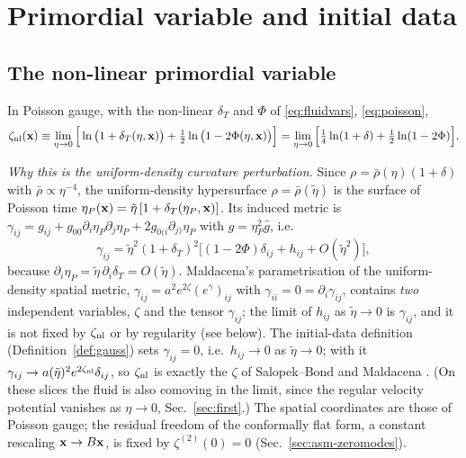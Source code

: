 \section{Primordial variable and initial data}
\label{sec:primordial}

\subsection{The non-linear primordial variable}
\label{sec:zeta_def}
\begin{definition}\label{def:zeta}
In Poisson gauge, with the non-linear $\delta_T$ and $\Phi$ of \eqref{eq:fluidvars}, \eqref{eq:poisson},
\begin{equation}
\zeta_{\rm nl}(\mathbf x)\equiv\lim_{\eta\to0}\Big[\ln\big(1+\delta_T(\eta,\mathbf x)\big)+\tfrac12\ln\big(1-2\Phi(\eta,\mathbf x)\big)\Big]
=\lim_{\eta\to0}\Big[\tfrac14\ln(1+\delta)+\tfrac12\ln(1-2\Phi)\Big].
\label{eq:zeta_nl}
\end{equation}
\end{definition}
\noindent\emph{Why this is the uniform-density curvature perturbation.}  Since $\rho=\bar\rho(\eta)(1+\delta)$
with $\bar\rho\propto\eta^{-4}$, the uniform-density hypersurface $\rho=\bar\rho(\tilde\eta)$ is the
surface of Poisson time $\eta_P(\mathbf x)=\tilde\eta\,[1+\delta_T(\eta_P,\mathbf x)]$.  Its induced metric is
$\gamma_{ij}=g_{ij}+g_{00}\partial_i\eta_P\partial_j\eta_P+2g_{0(i}\partial_{j)}\eta_P$ with $g=\eta_P^2\hat g$, i.e.
\begin{equation}
\gamma_{ij}=\tilde\eta^2(1+\delta_T)^2\Big[(1-2\Phi)\delta_{ij}+h_{ij}+O(\tilde\eta^2)\Big],
\end{equation}
because $\partial_i\eta_P=\tilde\eta\,\partial_i\delta_T=O(\tilde\eta)$.  Maldacena's parametrisation of the uniform-density
spatial metric, $\gamma_{ij}=a^2e^{2\zeta}(e^{\gamma})_{ij}$ with $\gamma_{ii}=0=\partial_i\gamma_{ij}$, contains \emph{two} independent
variables, $\zeta$ and the tensor $\gamma_{ij}$; the limit of $h_{ij}$ as $\tilde\eta\to0$ is $\gamma_{ij}$, and it is not fixed by
$\zeta_{\rm nl}$ or by regularity (see below).  The initial-data definition (Definition~\ref{def:gauss}) sets $\gamma_{ij}=0$, i.e.\
$h_{ij}\to0$ as $\tilde\eta\to0$; with it $\gamma_{ij}\to a(\tilde\eta)^2e^{2\zeta_{\rm nl}}\delta_{ij}$, so $\zeta_{\rm nl}$ is exactly the $\zeta$ of
Salopek--Bond and Maldacena \cite{SalopekBond,Maldacena}.  (On these slices the fluid is also comoving in the limit, since the regular
velocity potential vanishes as $\eta\to0$, Sec.~\ref{sec:first}.)  The spatial coordinates are those of Poisson
gauge; the residual freedom of the conformally flat form, a constant rescaling $\mathbf x\to B\mathbf x$, is fixed by $\zeta^{(2)}(0)=0$
(Sec.~\ref{sec:asm-zeromodes}).

